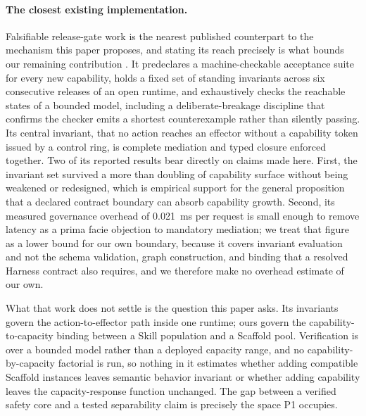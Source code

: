 \paragraph{The closest existing implementation.}
Falsifiable release-gate work is the nearest published counterpart to the mechanism this paper proposes, and stating its reach precisely is what bounds our remaining contribution \cite{soni2026gates}. It predeclares a machine-checkable acceptance suite for every new capability, holds a fixed set of standing invariants across six consecutive releases of an open runtime, and exhaustively checks the reachable states of a bounded model, including a deliberate-breakage discipline that confirms the checker emits a shortest counterexample rather than silently passing. Its central invariant, that no action reaches an effector without a capability token issued by a control ring, is complete mediation and typed closure enforced together. Two of its reported results bear directly on claims made here. First, the invariant set survived a more than doubling of capability surface without being weakened or redesigned, which is empirical support for the general proposition that a declared contract boundary can absorb capability growth. Second, its measured governance overhead of 0.021~ms per request is small enough to remove latency as a prima facie objection to mandatory mediation; we treat that figure as a lower bound for our own boundary, because it covers invariant evaluation and not the schema validation, graph construction, and binding that a resolved Harness contract also requires, and we therefore make no overhead estimate of our own.

What that work does not settle is the question this paper asks. Its invariants govern the action-to-effector path inside one runtime; ours govern the capability-to-capacity binding between a Skill population and a Scaffold pool. Verification is over a bounded model rather than a deployed capacity range, and no capability-by-capacity factorial is run, so nothing in it estimates whether adding compatible Scaffold instances leaves semantic behavior invariant or whether adding capability leaves the capacity-response function unchanged. The gap between a verified safety core and a tested separability claim is precisely the space P1 occupies.


